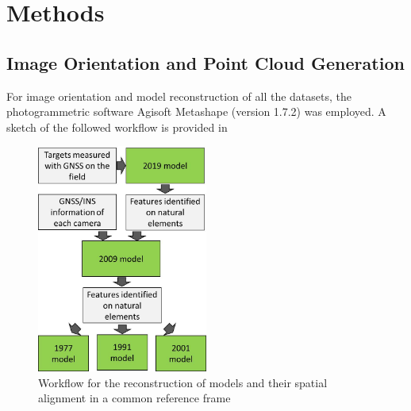 \section{Methods}\label{sec:2:methods}

\subsection{Image Orientation and Point Cloud Generation}

For image orientation and model reconstruction of all the datasets, the photogrammetric software Agisoft Metashape (version 1.7.2) was employed. A sketch of the followed
workflow is provided in 

\begin{figure}
    \centering
    \includegraphics[width=0.5\textwidth]{workflow}
    \caption{Workflow for the reconstruction of models and their spatial alignment in a common reference frame}
    \label{fig:2:workflow}
\end{figure}

